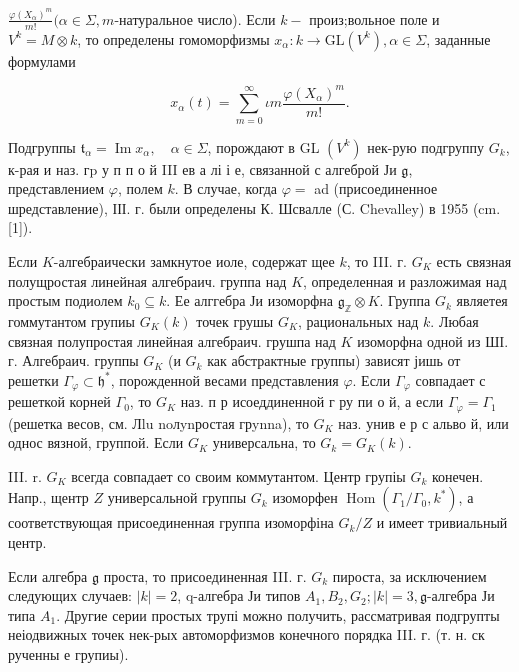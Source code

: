 \documentclass[10pt]{article}
\begin{document}
$\frac{\varphi\left(X_{\alpha}\right)^{m}}{m !}(\alpha \in \Sigma, m$-натуральное число). Если $k-$ произ;вольное поле и $V^{k}=M \otimes k$, то определены гомоморфизмы $x_{\alpha}: k \longrightarrow \mathrm{GL}\left(V^{k}\right), \alpha \in \Sigma$, заданные формулами



\[

x_{\alpha}(t)=\sum_{m=0}^{\infty} \iota m \frac{\varphi\left(X_{\alpha}\right)^{m}}{m !} .

\]



Подгруппы $\mathfrak{t}_{\alpha}=\operatorname{Im} x_{\alpha}, \quad \alpha \in \Sigma$, порождают в GL $\left(V^{k}\right)$ нек-рую подгруппу $G_{k}$, к-рая и наз. гp у п п о й III ев а лі і е, связанной с алгеброй Ји $\mathfrak{g}$, представлением $\varphi$, полем $k$. В случае, когда $\varphi=$ ad (присоединенное шредставление), ІІІ. г. были определены К. Шсвалле (С. Chevalley) в 1955 (cm. [1]).



Если $K$-алгебраически замкнутое иоле, содержат щее $k$, то III. г. $G_{K}$ есть связная полущростая линейная алгебраич. группа над $K$, определенная и разложимая над простым подиолем $k_{0} \subseteq k$. Ее алггебра Ји изоморфна $\mathfrak{g}_{\mathbb{Z}} \otimes K$. Группа $G_{k}$ являетея гоммутантом групиы $G_{K}(k)$ точек грушы $G_{K}$, рациональных над $k$. Любая связная полупростая линейная алгебраич. грушпа над $K$ изоморфна одной из ШI. г. Алгебраич. группы $G_{K}$ (и $G_{k}$ как абстрактные группы) зависят јишь от решетки $\Gamma_{\varphi} \subset \mathfrak{h}^{*}$, порожденной весами представления $\varphi$. Если $\Gamma_{\varphi}$ совпадает с решеткой корней $\Gamma_{0}$, то $G_{K}$ наз. п р исоеддиненной г ру пи о й, а если $\Gamma_{\varphi}=\Gamma_{1}$ (решетка весов, см. Лlu noлynростая грynna), то $G_{K}$ наз. унив е р с альво й, или однос вязной, группой. Если $G_{K}$ универсальна, то $G_{k}=G_{K}(k)$.



III. r. $G_{K}$ всегда совпадает со своим коммутантом. Центр групіы $G_{k}$ конечен. Напр., щентр $Z$ универсальной группы $G_{k}$ изоморфен $\operatorname{Hom}\left(\Gamma_{1} / \Gamma_{0}, k^{*}\right)$, а соответствующая присоединенная группа изоморфіна $G_{k} / Z$ и имеет тривиальный центр.



Если алгебра $\mathfrak{g}$ проста, то присоединенная III. г. $G_{k}$ пироста, за исключением следующих случаев: $|k|=2$, q-алгебра Ји типов $A_{1}, B_{2}, G_{2} ;|k|=3, \mathfrak{g}$-алгебра Ји типа $A_{1}$. Другие серии простых трупі можно получить, рассматривая подгрупты неіодвижных точек нек-рых автоморфизмов конечного порядка III. г. (т. н. ск рученны е групиы).
\end{document}
